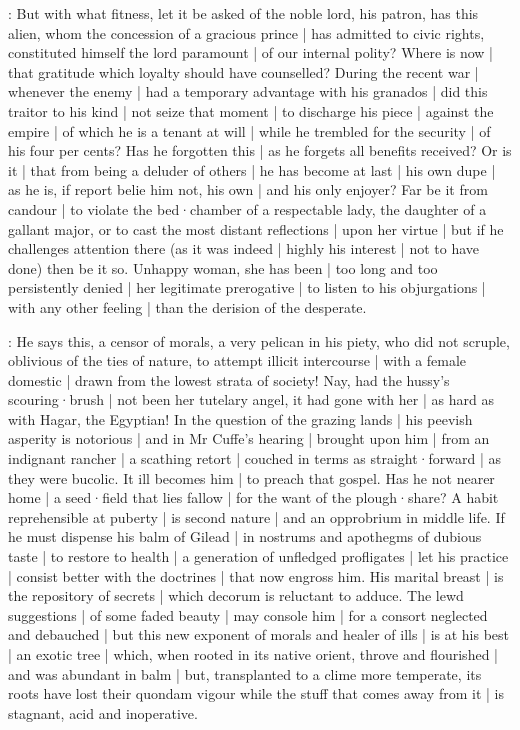 \begin{omitted}



:
But with what fitness,
let it be asked of the noble lord,
his patron,
has this alien,
whom the concession of a gracious prince |
has admitted to civic rights,
constituted himself the lord paramount |
of our internal polity?
Where is now |
that gratitude which loyalty should have counselled?
During the recent war |
whenever the enemy |
had a temporary advantage with his granados |
did this traitor to his kind |
not seize that moment |
to discharge his piece |
against the empire |
of which he is a tenant at will |
while he trembled for the security |
of his four per cents?
Has he forgotten this |
as he forgets all benefits received?
Or is it |
that from being a deluder of others |
he has become at last |
his own dupe |
as he is,
if report belie him not,
his own |
and his only enjoyer?
Far be it from candour |
to violate the bed·chamber of a respectable lady,
the daughter of a gallant major,
or to cast the most distant reflections |
upon her virtue |
but if he challenges attention there
(as it was indeed |
highly his interest |
not to have done)
then be it so.
Unhappy woman,
she has been |
too long and too persistently denied |
her legitimate prerogative |
to listen to his objurgations |
with any other feeling |
than the derision of the desperate.

:
He says this,
a censor of morals,
a very pelican in his piety,
who did not scruple,
oblivious of the ties of nature,
to attempt illicit intercourse |
with a female domestic |
drawn from the lowest strata of society!
Nay,
had the hussy's scouring·brush |
not been her tutelary angel,
it had gone with her |
as hard as with Hagar,
the Egyptian!
In the question of the grazing lands |
his peevish asperity is notorious |
and in Mr Cuffe's hearing |
brought upon him |
from an indignant rancher |
a scathing retort |
couched in terms as straight·forward |
as they were bucolic.
It ill becomes him |
to preach that gospel.
Has he not nearer home |
a seed·field that lies fallow |
for the want of the plough·share?
A habit reprehensible at puberty |
is second nature |
and an opprobrium in middle life.
If he must dispense his balm of Gilead |
in nostrums and apothegms of dubious taste |
to restore to health |
a generation of unfledged profligates |
let his practice |
consist better with the doctrines |
that now engross him.
His marital breast |
is the repository of secrets |
which decorum is reluctant to adduce.
The lewd suggestions |
of some faded beauty |
may console him |
for a consort neglected and debauched |
but this new exponent of morals and healer of ills |
is at his best |
an exotic tree |
which,
when rooted in its native orient,
throve and flourished |
and was abundant in balm |
but,
transplanted to a clime more temperate,
its roots have lost their quondam vigour
while the stuff that comes away from it |
is stagnant,
acid and inoperative.
\end{omitted}

